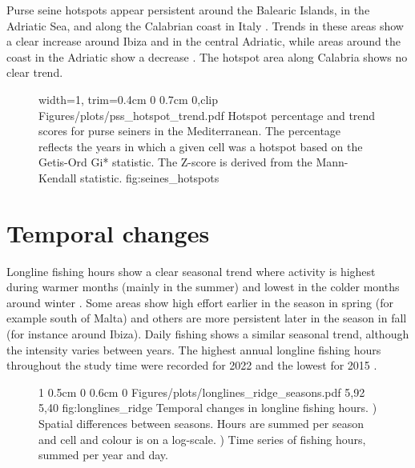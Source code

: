 Purse seine hotspots appear persistent around the Balearic Islands, in the Adriatic Sea, and along the Calabrian coast in Italy .
Trends in these areas show a clear increase around Ibiza and in the central Adriatic, while areas around the coast in the Adriatic show a decrease .
The hotspot area along Calabria shows no clear trend.

\begin{figure}[ht]
    {width=1\linewidth, trim=0.4cm 0 0.7cm 0,clip}
    {Figures/plots/pss_hotspot_trend.pdf}
    {%
    Hotspot percentage and trend scores for purse seiners in the Mediterranean.
    The percentage reflects the years in which a given cell was a hotspot based on the Getis-Ord Gi* statistic.
    The Z-score is derived from the Mann-Kendall statistic.}
    {fig:seines_hotspots}
\end{figure}

\FloatBarrier
\section{Temporal changes}
Longline fishing hours show a clear seasonal trend where activity is highest during warmer months (mainly in the summer) and lowest in the colder months around winter . Some areas show high
effort earlier in the season in spring (for example south of Malta) and others are more persistent later in the season in fall (for instance around Ibiza).
Daily fishing shows a similar seasonal trend, although the intensity varies between years. The highest annual longline fishing hours throughout the study time were recorded for 2022
and the lowest for 2015 .

\begin{figure}[htp]
    {1\linewidth}                           %
    {0.5cm 0 0.6cm 0}                       %
    {Figures/plots/longlines_ridge_seasons.pdf} %
    {5,92}                                  %
    {5,40}                                  %
    {fig:longlines_ridge}
    {%
    Temporal changes in longline fishing hours. ) Spatial differences between seasons. 
    Hours are summed per season and cell and colour is on a log-scale. ) Time series of fishing hours, summed per year 
    and day.}
\end{figure}

